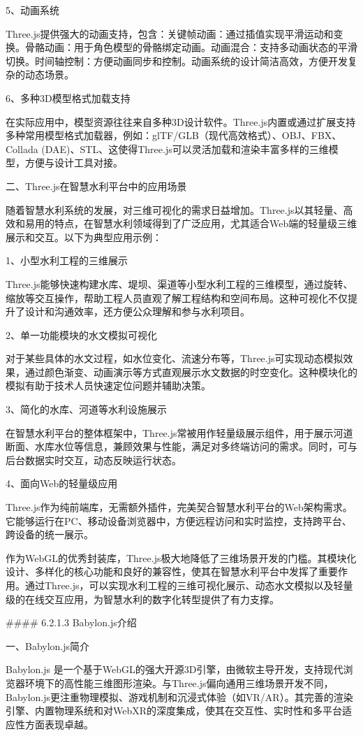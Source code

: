 5、动画系统

Three.js提供强大的动画支持，包含：关键帧动画：通过插值实现平滑运动和变换。骨骼动画：用于角色模型的骨骼绑定动画。动画混合：支持多动画状态的平滑切换。时间轴控制：方便动画同步和控制。动画系统的设计简洁高效，方便开发复杂的动态场景。

6、多种3D模型格式加载支持

在实际应用中，模型资源往往来自多种3D设计软件。Three.js内置或通过扩展支持多种常用模型格式加载器，例如：glTF/GLB（现代高效格式）、OBJ、FBX、Collada (DAE)、STL、这使得Three.js可以灵活加载和渲染丰富多样的三维模型，方便与设计工具对接。

二、Three.js在智慧水利平台中的应用场景

随着智慧水利系统的发展，对三维可视化的需求日益增加。Three.js以其轻量、高效和易用的特点，在智慧水利领域得到了广泛应用，尤其适合Web端的轻量级三维展示和交互。以下为典型应用示例：

1、小型水利工程的三维展示

Three.js能够快速构建水库、堤坝、渠道等小型水利工程的三维模型，通过旋转、缩放等交互操作，帮助工程人员直观了解工程结构和空间布局。这种可视化不仅提升了设计和沟通效率，还方便公众理解和参与水利项目。

2、单一功能模块的水文模拟可视化

对于某些具体的水文过程，如水位变化、流速分布等，Three.js可实现动态模拟效果，通过颜色渐变、动画演示等方式直观展示水文数据的时空变化。这种模块化的模拟有助于技术人员快速定位问题并辅助决策。

3、简化的水库、河道等水利设施展示

在智慧水利平台的整体框架中，Three.js常被用作轻量级展示组件，用于展示河道断面、水库水位等信息，兼顾效果与性能，满足对多终端访问的需求。同时，可与后台数据实时交互，动态反映运行状态。

4、面向Web的轻量级应用

Three.js作为纯前端库，无需额外插件，完美契合智慧水利平台的Web架构需求。它能够运行在PC、移动设备浏览器中，方便远程访问和实时监控，支持跨平台、跨设备的统一展示。

作为WebGL的优秀封装库，Three.js极大地降低了三维场景开发的门槛。其模块化设计、多样化的核心功能和良好的兼容性，使其在智慧水利平台中发挥了重要作用。通过Three.js，可以实现水利工程的三维可视化展示、动态水文模拟以及轻量级的在线交互应用，为智慧水利的数字化转型提供了有力支撑。

\#\#\#\# 6.2.1.3 Babylon.js介绍

一、Babylon.js简介

Babylon.js 是一个基于WebGL的强大开源3D引擎，由微软主导开发，支持现代浏览器环境下的高性能三维图形渲染。与Three.js偏向通用三维场景开发不同，Babylon.js更注重物理模拟、游戏机制和沉浸式体验（如VR/AR）。其完善的渲染引擎、内置物理系统和对WebXR的深度集成，使其在交互性、实时性和多平台适应性方面表现卓越。

